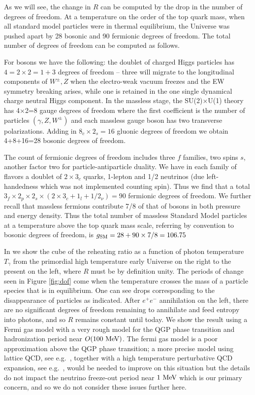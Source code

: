 {As we will see, the change in $R$ can be computed by the drop in the number of degrees of freedom. At a temperature on the order of the top quark mass, when all standard model particles were in thermal equilibrium, the Universe was pushed apart by 28 bosonic and 90 fermionic degrees of freedom. The total number of degrees of freedom can be computed as follows. 

For bosons we have the following: the doublet of charged Higgs particles has $4=2\times2=1+3$ degrees of freedom -- three will migrate to the longitudinal components of $W^\pm, Z$ when the electro-weak vacuum freezes and the EW symmetry breaking arises, while one is retained in the one single dynamical charge neutral Higgs component. In the massless stage, the SU(2)$\times$U(1) theory has 4$\times$2=8 gauge degrees of freedom where the first coefficient is the number of particles $(\gamma, Z, W^\pm)$ and each massless gauge boson has two transverse polarizations. Adding in $8_c\times2_s=16$ gluonic degrees of freedom we obtain 4+8+16=28 bosonic degrees of freedom. 

The count of fermionic degrees of freedom includes three $f$ families, two spins $s$, another factor two for particle-antiparticle duality. We have in each family of flavors a doublet of $2\times 3_c$ quarks, 1-lepton and 1/2 neutrinos (due left-handedness which was not implemented counting spin). Thus we find that a total $3_f\times 2_p\times 2_s\times(2\times 3_c+1_l+1/2_\nu)=90$ fermionic degrees of freedom. We further recall that massless fermions contribute 7/8 of that of bosons in both pressure and energy density. Thus the total number of massless Standard Model particles at a temperature above the top quark mass scale, referring by convention to bosonic degrees of freedom, is $g_{\rm SM}=28+90\times 7/8=106.75$ 



In  we show the cube of the reheating ratio  as a function of photon temperature $T_\gamma$ from the primordial high temperature early Universe on the right to the present on the left, where $R$ must be by definition unity. The periods of change seen in Figure \ref{fig:dof} come when the temperature crosses the mass of a particle species that is in equilibrium. One can see drops corresponding to the disappearance of particles as indicated. After $e^+e^-$ annihilation on the left, there are no significant degrees of freedom remaining to annihilate and feed entropy into photons, and so $R$ remains constant until today. We show the result using a Fermi gas model with a very rough model for the QGP phase transition and hadronization period near $O(100\text{ MeV})$. The fermi gas model is a poor approximation above the QGP phase transition; a more precise model using lattice QCD, see e.g.~\cite{Borsanyi:2013bia}, together with a high temperature perturbative QCD expansion, see e.g.~\cite{Letessier:2002ony}, would be needed to improve on this situation but the details do not impact the neutrino freeze-out period near $1\text{ MeV}$ which is our primary concern, and so we do not consider these issues further here.

}
